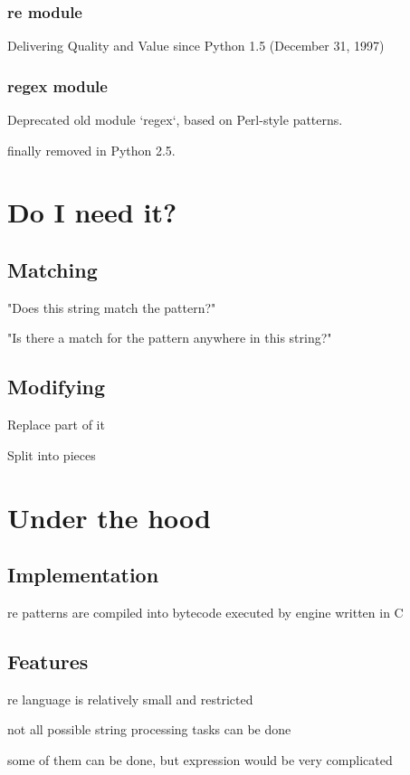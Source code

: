 \documentclass{beamer}
\begin{document}
\subsubsection{re module}
\begin{frame}
Delivering Quality and Value since Python 1.5 (December 31, 1997)
\pause
\subsubsection{regex module}
\item Deprecated old module `regex`, based on Perl-style patterns.
\item finally removed in Python 2.5.
\end{frame}

\section{Do I need it?}
\subsection{Matching}
\begin{frame}
\item "Does this string match the pattern?"
\item "Is there a match for the pattern anywhere in this string?"

\subsection{Modifying}
\item Replace part of it
\item Split into pieces
\end{frame}

\section{Under the hood}
\subsection{Implementation}
\begin{frame}
re patterns are compiled into bytecode
\pause
executed by engine written in C
\end{frame}

\subsection{Features}
\begin{frame}
re language is relatively small and restricted
\item not all possible string processing tasks can be done
\item some of them can be done, but expression would be very complicated
\end{frame}
\end{document}
